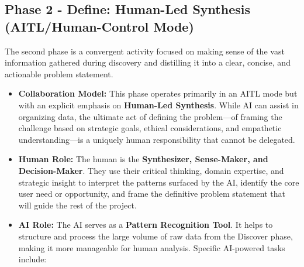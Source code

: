\documentclass[
  12pt,
  a4paper,
  bibliography=totoc,
  numbers=noenddot
]{scrartcl}
\begin{document}
\subsection{Phase 2 - Define: Human-Led
Synthesis (AITL/Human-Control
Mode)}\label{phase-2---define-human-led-synthesis-aitlhuman-control-mode}

The second phase is a convergent activity focused on making sense of the
vast information gathered during discovery and distilling it into a
clear, concise, and actionable problem statement.

\begin{itemize}
\item
  \textbf{Collaboration Model:} This phase operates primarily in an AITL
  mode but with an explicit emphasis on \textbf{Human-Led Synthesis}.
  While AI can assist in organizing data, the ultimate act of defining
  the problem---of framing the challenge based on strategic goals,
  ethical considerations, and empathetic understanding---is a uniquely
  human responsibility that cannot be delegated.
\item
  \textbf{Human Role:} The human is the \textbf{Synthesizer,
  Sense-Maker, and Decision-Maker}. They use their critical thinking,
  domain expertise, and strategic insight to interpret the patterns
  surfaced by the AI, identify the core user need or opportunity, and
  frame the definitive problem statement that will guide the rest of the
  project.\cite{danramsden2025limitations}
\item
  \textbf{AI Role:} The AI serves as a \textbf{Pattern Recognition
  Tool}. It helps to structure and process the large volume of raw data
  from the Discover phase, making it more manageable for human analysis.
  Specific AI-powered tasks include:


\end{itemize}
\end{document}
